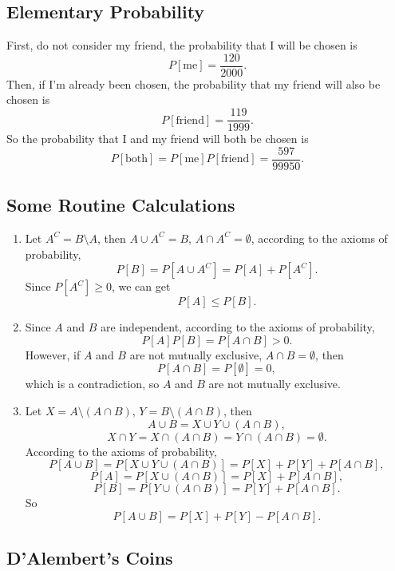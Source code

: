 \documentclass[11pt,a4paper]{article}
\author{Group 37}
\subtitle{Assignment}
\begin{document}
\maketitle

\subsection{Elementary Probability}

First, do not consider my friend, the probability that I will be chosen is
$$P[\textrm{me}]=\frac{120}{2000}.$$
Then, if I'm already been chosen, the probability that my friend will also be chosen is
$$P[\textrm{friend}]=\frac{119}{1999}.$$
So the probability that I and my friend will both be chosen is
$$P[\textrm{both}]=P[\textrm{me}]P[\textrm{friend}]=\frac{597}{99950}.$$

\subsection{Some Routine Calculations}

\begin{enumerate}[label=\roman*)]
\item
Let $A^C=B\setminus A$, then $A\cup A^C=B$, $A\cap A^C=\emptyset$, according to the axioms of probability,
$$P[B]=P[A\cup A^C]=P[A]+P[A^C].$$
Since $P[A^C]\geqslant 0$, we can get
$$P[A]\leqslant P[B].$$
\item 
Since $A$ and $B$ are independent, according to the axioms of probability,
$$P[A]P[B]=P[A\cap B]>0.$$
However, if $A$ and $B$ are not mutually exclusive,
$A\cap B=\emptyset$, then
$$P[A\cap B]=P[\emptyset]=0,$$
which is a contradiction, so $A$ and $B$ are not mutually exclusive. \bigskip
\item 
Let $X=A\setminus(A\cap B)$, $Y=B\setminus(A\cap B)$, then 
$$A\cup B=X\cup Y\cup (A\cap B),$$
$$X\cap Y=X\cap(A\cap B)=Y\cap(A\cap B)=\emptyset.$$
According to the axioms of probability,
$$P[A\cup B]=P[X\cup Y\cup (A\cap B)]=P[X]+P[Y]+P[A\cap B],$$
$$P[A]=P[X\cup(A\cap B)]=P[X]+P[A\cap B],$$
$$P[B]=P[Y\cup(A\cap B)]=P[Y]+P[A\cap B].$$
So $$P[A\cup B]=P[X]+P[Y]-P[A\cap B].$$
\end{enumerate}

\subsection{D'Alembert's Coins}
\end{document}
